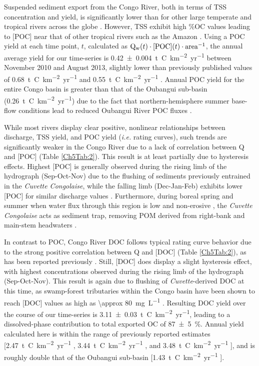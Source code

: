 Suspended sediment export from the Congo River, both in terms of TSS concentration and yield, is significantly lower than for other large temperate and tropical rivers across the globe \citep{Ludwig:1998ud,Milliman:2011ug,Galy:2015fx}. However, TSS exhibit high \%OC values leading to [POC] near that of other tropical rivers such as the Amazon \citep{Richey:1990wl}. Using a POC yield at each time point, $t$, calculated as $\text{Q\textsubscript{w}}(t) \cdot \text{[POC]}(t) \cdot \text{area}^{-1}$, the annual average yield for our time-series is \SI{0.42 \pm 0.004}{t.C.km^{-2}.yr^{-1}} between November 2010 and August 2013, slightly lower than previously published values of \SI{0.68}{t.C.km^{-2}.yr^{-1}} \citep{Ludwig:1996ul} and \SI{0.55}{t.C.km^{-2}.yr^{-1}} \citep{Coynel:2005cn,Spencer:2016ho}. Annual POC yield for the entire Congo basin is greater than that of the Oubangui sub-basin (\SI{0.26}{t.C.km^{-2}.yr^{-1}}) due to the fact that northern-hemisphere summer base-flow conditions lead to reduced Oubangui River POC fluxes \citep{Bouillon:2012cw}.

While most rivers display clear positive, nonlinear relationships between discharge, TSS yield, and POC yield (\textit{i.e.} rating curves), such trends are significantly weaker in the Congo River due to a lack of correlation between Q and [POC] (Table \ref{Ch5Tab:2}). This result is at least partially due to hysteresis effects. Highest [POC] is generally observed during the rising limb of the hydrograph (Sep-Oct-Nov) due to the flushing of sediments previously entrained in the \textit{Cuvette Congolaise}, while the falling limb (Dec-Jan-Feb) exhibits lower [POC] for similar discharge values \citep{Spencer:2016ho}. Furthermore, during boreal spring and summer when water flux through this region is low and non-erosive \citep{Bricquet:1993ve,Henchiri:2016jh}, the \textit{Cuvette Congolaise} acts as sediment trap, removing POM derived from right-bank and main-stem headwaters \citep{Laraque:2009fz}.

In contrast to POC, Congo River DOC follows typical rating curve behavior due to the strong positive correlation between Q and [DOC] (Table \ref{Ch5Tab:2}), as has been reported previously \citep{Coynel:2005cn,Wang:2013js,Spencer:2016ho}. Still, [DOC] does display a slight hysteresis effect, with highest concentrations observed during the rising limb of the hydrograph (Sep-Oct-Nov). This result is again due to flushing of \textit{Cuvette}-derived DOC at this time, as swamp-forest tributaries within the Congo basin have been shown to reach [DOC] values as high as \SI{\approx 80}{mg.L^{-1}} \citep{Mann:2014jx}. Resulting DOC yield over the course of our time-series is \SI{3.11 \pm 0.03}{t.C.km^{-2}. yr^{-1}}, leading to a dissolved-phase contribution to total exported OC of \SI{87 \pm 5}{\%}. Annual yield calculated here is within the range of previously reported estimates [\SI{2.47}{t.C.km^{-2}.yr^{-1}} \citep{Ludwig:1996ul}, \SI{3.44}{t.C.km^{-2}.yr^{-1}} \citep{Coynel:2005cn}, and \SI{3.48}{t.C.km^{-2}.yr^{-1}} \citep{Spencer:2016ho}], and is roughly double that of the Oubangui sub-basin [\SI{1.43}{t.C.km^{-2}.yr^{-1}} \citep{Bouillon:2012cw}].


